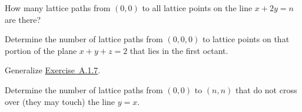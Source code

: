 \documentclass[10pt,]{book}
\theoremstyle{plain}
\theoremstyle{definition}
\theoremstyle{definition}
\theoremstyle{definition}
\theoremstyle{definition}
\numberwithin{equation}{chapter}
\begin{document}
\begin{divisionexercise}{6}\hypertarget{exercise-127}{}
\hypertarget{p-1167}{}%
How many lattice paths from \(\left( 0,0 \right)\) to all lattice points on the line \(x + 2y = n\) are there?%
\end{divisionexercise}%
\begin{divisionexercise}{7}\hypertarget{ex-paths-to-plane}{}
\hypertarget{p-1168}{}%
Determine the number of lattice paths from \(\left( 0,0,0 \right)\) to lattice points on that portion of the plane \(x + y + z = 2\) that lies in the first octant.%
\end{divisionexercise}%
\begin{divisionexercise}{8}\hypertarget{exercise-129}{}
\hypertarget{p-1169}{}%
Generalize \hyperlink{ex-paths-to-plane}{Exercise~A.1.7}.%
\end{divisionexercise}%
\begin{divisionexercise}{9}\hypertarget{exercise-130}{}
\hypertarget{p-1170}{}%
Determine the number of lattice paths from \(\left( 0,0 \right)\) to \((n,n)\) that do not cross over (they may touch) the line \(y = x\).%
\end{divisionexercise}%
\typeout{************************************************}
\typeout{************************************************}
\end{document}
